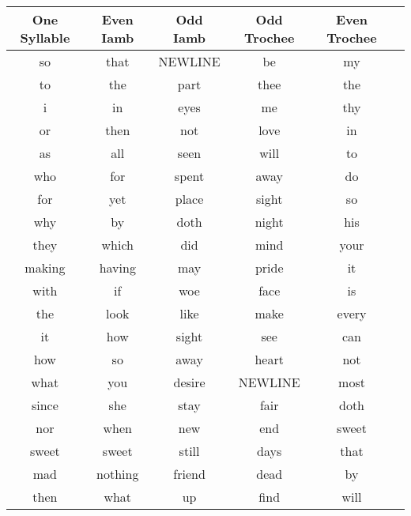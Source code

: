 \begin{itemize}
\begin{tabular}{|c|c|c|c|c|c|}
    \hline
    One Syllable & Even Iamb & Odd Iamb & Odd Trochee & Even Trochee \\
    \hline
    so & that & NEWLINE & be & my \\
    to & the & part & thee & the \\
    i & in & eyes & me & thy \\
    or & then & not & love & in \\
    as & all & seen & will & to \\
    who & for & spent & away & do \\
    for & yet & place & sight & so \\
    why & by & doth & night & his \\
    they & which & did & mind & your \\
    making & having & may & pride & it \\
    with & if & woe & face & is \\
    the & look & like & make & every \\
    it & how & sight & see & can \\
    how & so & away & heart & not \\
    what & you & desire & NEWLINE & most \\
    since & she & stay & fair & doth \\
    nor & when & new & end & sweet \\
    sweet & sweet & still & days & that \\
    mad & nothing & friend & dead & by \\
    then & what & up & find & will \\
    \hline
\end{tabular}


\end{itemize}


